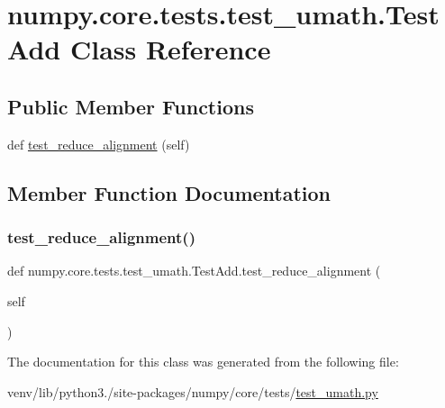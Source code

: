 \hypertarget{classnumpy_1_1core_1_1tests_1_1test__umath_1_1TestAdd}{}\section{numpy.\+core.\+tests.\+test\+\_\+umath.\+Test\+Add Class Reference}
\label{classnumpy_1_1core_1_1tests_1_1test__umath_1_1TestAdd}
\subsection*{Public Member Functions}
\begin{DoxyCompactItemize}
\item 
def \hyperlink{classnumpy_1_1core_1_1tests_1_1test__umath_1_1TestAdd_ad7e17bb2bce5670421706b2f1f8cbf12}{test\+\_\+reduce\+\_\+alignment} (self)
\end{DoxyCompactItemize}


\subsection{Member Function Documentation}
\mbox{\label{classnumpy_1_1core_1_1tests_1_1test__umath_1_1TestAdd_ad7e17bb2bce5670421706b2f1f8cbf12}} 
\subsubsection{\texorpdfstring{test\+\_\+reduce\+\_\+alignment()}{test\_reduce\_alignment()}}
{\footnotesize\ttfamily def numpy.\+core.\+tests.\+test\+\_\+umath.\+Test\+Add.\+test\+\_\+reduce\+\_\+alignment (\begin{DoxyParamCaption}\item[{}]{self }\end{DoxyParamCaption})}



The documentation for this class was generated from the following file\+:\begin{DoxyCompactItemize}
\item 
venv/lib/python3./site-\/packages/numpy/core/tests/\hyperlink{test__umath_8py}{test\+\_\+umath.\+py}\end{DoxyCompactItemize}
